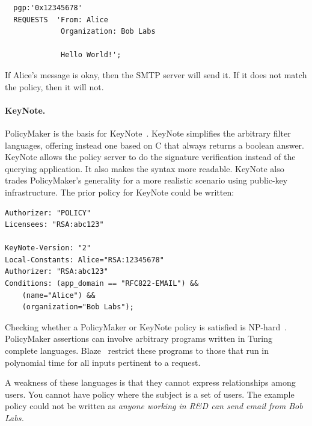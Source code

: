 \documentclass[thesis.tex]{subfiles}
\begin{document}
\begin{lstlisting}
  pgp:'0x12345678'
  REQUESTS  'From: Alice
             Organization: Bob Labs

             Hello World!';
\end{lstlisting}

If Alice's message is okay, then the SMTP server will send it.  If it does not match the policy, then it will not.

\paragraph*{KeyNote.}
PolicyMaker is the basis for KeyNote~\cite{blaze_role_1999,blaze_keynote:_1998}.
KeyNote simplifies the arbitrary filter languages, offering instead one based on
C that always returns a boolean answer. KeyNote allows the policy server to do
the signature verification instead of the querying application. It also makes the
syntax more readable. KeyNote also trades PolicyMaker's generality for a more
realistic scenario using public-key infrastructure. The prior policy for KeyNote
could be written:

\noindent\begin{minipage}{\textwidth}
\begin{lstlisting}
Authorizer: "POLICY"
Licensees: "RSA:abc123"

KeyNote-Version: "2"
Local-Constants: Alice="RSA:12345678" 
Authorizer: "RSA:abc123"
Conditions: (app_domain == "RFC822-EMAIL") &&
    (name="Alice") &&
    (organization="Bob Labs");
\end{lstlisting}
\end{minipage}

Checking whether a PolicyMaker or KeyNote policy is satisfied is
NP-hard~\cite{blaze_compliance_1998}. PolicyMaker assertions can involve
arbitrary programs written in Turing complete languages. Blaze~\etal{} restrict
these programs to those that run in polynomial time for all inputs pertinent to
a request.

A weakness of these languages is that they cannot express relationships among
users. You cannot have policy where the subject is a set of users. The example
policy could not be written as \emph{anyone working in R\&D can send email from
Bob Labs.}

\end{document}
